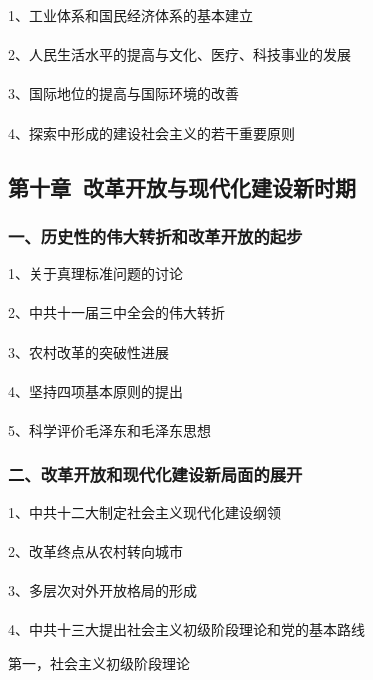 \documentclass{ctexart}
\begin{document}
1、工业体系和国民经济体系的基本建立
\\\\

2、人民生活水平的提高与文化、医疗、科技事业的发展
\\\\

3、国际地位的提高与国际环境的改善
\\\\

4、探索中形成的建设社会主义的若干重要原则

\subsection{第十章\ 改革开放与现代化建设新时期}
\subsubsection{一、历史性的伟大转折和改革开放的起步}

1、关于真理标准问题的讨论
\\\\

2、中共十一届三中全会的伟大转折
\\\\

3、农村改革的突破性进展
\\\\

4、坚持四项基本原则的提出
\\\\

5、科学评价毛泽东和毛泽东思想



\subsubsection{二、改革开放和现代化建设新局面的展开}

1、中共十二大制定社会主义现代化建设纲领
\\\\

2、改革终点从农村转向城市
\\\\

3、多层次对外开放格局的形成
\\\\

4、中共十三大提出社会主义初级阶段理论和党的基本路线

第一，社会主义初级阶段理论
\end{document}
